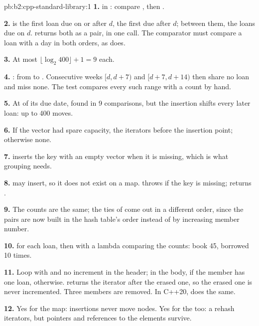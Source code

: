 \begin{solution}{pb:b2:cpp-standard-library:1}
\textbf{1.}  in : compare , then .

\textbf{2.}  is the first loan due on or after $d$,  the first due after
$d$; between them, the loans due on $d$.  returns both as a pair, in one call. The comparator must
compare a loan with a day in both orders, as  does.

\textbf{3.} At most $\lfloor \log_2 400 \rfloor + 1 = 9$ each.

\textbf{4.} : from  to . Consecutive
weeks $[d, d + 7)$ and $[d + 7, d + 14)$ then share no loan and miss none. The test compares every such range with a
count by hand.

\textbf{5.} At  of its due date, found in 9 comparisons, but the insertion shifts every later loan:
up to 400 moves.

\textbf{6.} If the vector had spare capacity, the iterators before the insertion point; otherwise none.

\textbf{7.}  inserts the key with an empty vector when it is missing, which is what grouping needs.

\textbf{8.}  may insert, so it does not exist on a  map.  throws if the key is
missing;  returns .

\textbf{9.} The counts are the same; the ties of  come out in a different order, since the
pairs are now built in the hash table's order instead of by increasing member number.

\textbf{10.}  for each loan, then  with a lambda comparing the counts:
book 45, borrowed 10 times.

\textbf{11.} Loop with  and no increment in the header; in the
body,  if the member has one loan,  otherwise.  returns the iterator
after the erased one, so the erased one is never incremented. Three members are removed. In C++20,
 does the same.

\textbf{12.} Yes for the map: insertions never move nodes. Yes for the  too: a rehash
 iterators, but pointers and references to the elements survive.


\end{solution}
